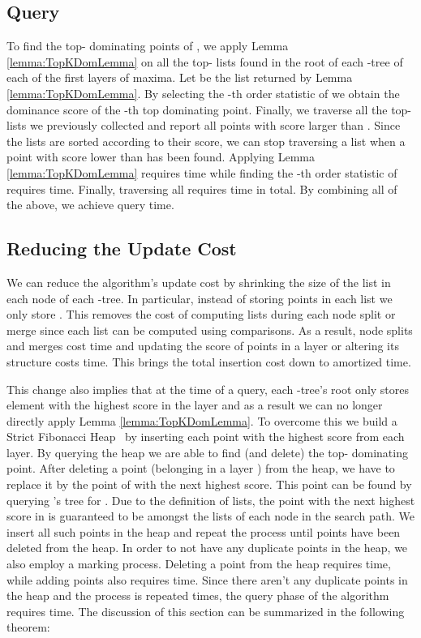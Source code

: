 \documentclass{llncs}
\begin{document}
\subsection{Query} \label{subsection:Query}
To find the top- dominating points of , we apply Lemma \ref{lemma:TopKDomLemma} on all the top- lists found in the root of each -tree of each of the  first layers of maxima. Let  be the list returned by Lemma \ref{lemma:TopKDomLemma}. By selecting the -th order statistic of  we obtain the dominance score  of the -th top dominating point. Finally, we traverse all the top- lists we previously collected and report all points with score larger than . Since the lists are sorted according to their score, we can stop traversing a list when a point with score lower than  has been found. Applying Lemma \ref{lemma:TopKDomLemma} requires  time while finding the -th order statistic of  requires  time. Finally, traversing all requires  time in total. By combining all of the above, we achieve  query time.

\subsection{Reducing the Update Cost} \label{subsection:ReduceUpdateCost}
We can reduce the algorithm's update cost by shrinking the size of the  list in each node of each -tree. In particular, instead of storing  points in each  list we only store . This removes the cost of computing  lists during each node split or merge since each  list can be computed using  comparisons. As a result, node splits and merges cost  time and updating the score of points in a layer or altering its structure costs  time. This brings the total insertion cost down to  amortized time.

This change also implies that at the time of a query, each -tree's root only stores  element with the highest score in the layer and as a result we can no longer directly apply Lemma \ref{lemma:TopKDomLemma}. To overcome this we build a Strict Fibonacci Heap~\cite{BrodalLT12} by inserting each point with the highest score from each layer. By querying the heap we are able to find (and delete) the top- dominating point. After deleting a point  (belonging in a layer ) from the heap, we have to replace it by the point of  with the next highest score. This point can be found by querying 's tree for . Due to the definition of  lists, the point with the next highest score in  is guaranteed to be amongst the   lists of each node in the search path. We insert all  such points in the heap and repeat the process until  points have been deleted from the heap. In order to not have any duplicate points in the heap, we also employ a marking process. Deleting a point from the heap requires  time, while adding  points also requires  time. Since there aren't any duplicate points in the heap and the process is repeated  times, the query phase of the algorithm requires  time. The discussion of this section can be summarized in the following theorem:
\end{document}
